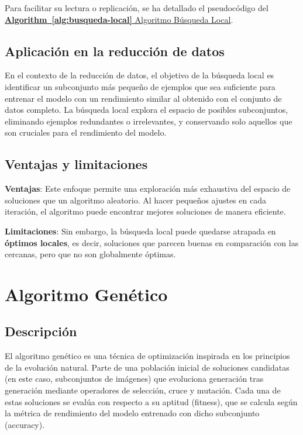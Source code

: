 Para facilitar su lectura o replicación, se ha detallado el pseudocódigo del \hyperref[alg:busqueda-local]{\textbf{Algorithm~\ref*{alg:busqueda-local}} Algoritmo Búsqueda Local}.

\subsection{Aplicación en la reducción de datos}\label{subsec:aplicacion-en-la-reduccion-de-datos-busqueda-local}
En el contexto de la reducción de datos, el objetivo de la búsqueda local es identificar un subconjunto más pequeño de
ejemplos que sea suficiente para entrenar el modelo con un rendimiento similar al obtenido con el conjunto de datos
completo.
La búsqueda local explora el espacio de posibles subconjuntos, eliminando ejemplos redundantes o irrelevantes, y
conservando solo aquellos que son cruciales para el rendimiento del modelo.

\subsection{Ventajas y limitaciones}\label{subsec:ventajas-y-limitaciones-busqueda-local}
\textbf{Ventajas}: Este enfoque permite una exploración más exhaustiva del espacio de soluciones que un algoritmo
aleatorio.
Al hacer pequeños ajustes en cada iteración, el algoritmo puede encontrar mejores soluciones de manera eficiente.


\textbf{Limitaciones}: Sin embargo, la búsqueda local puede quedarse atrapada en \textbf{óptimos locales}, es decir,
soluciones que parecen buenas en comparación con las cercanas, pero que no son globalmente óptimas.

\section{Algoritmo Genético}\label{sec:genetico-v1}
\subsection{Descripción}\label{subsec:descripcion-genetico-v1}
El algoritmo genético es una técnica de optimización inspirada en los principios de la evolución natural.
Parte de una población inicial de soluciones candidatas (en este caso, subconjuntos de imágenes) que evoluciona generación
tras generación mediante operadores de selección, cruce y mutación.
Cada una de estas soluciones se evalúa con respecto a su aptitud (fitness), que se calcula según la métrica de rendimiento
del modelo entrenado con dicho subconjunto (accuracy).

